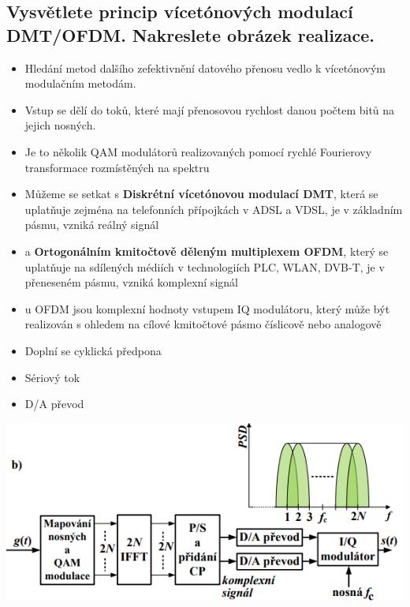 \subsection{Vysvětlete princip vícetónových modulací DMT/OFDM. Nakreslete obrázek realizace.}
\begin{itemize}
    \item Hledání metod dalšího zefektivnění datového přenosu vedlo k vícetónovým modulačním metodám.
    \item Vstup se dělí do toků, které mají přenosovou rychlost danou počtem bitů na jejich nosných.
    \item Je to několik QAM modulátorů realizovaných pomocí rychlé Fourierovy transformace rozmístěných na spektru
    \item Můžeme se setkat s \textbf{Diskrétní vícetónovou modulací DMT}, která se uplatňuje zejména na telefonních
    přípojkách v ADSL a VDSL, je v základním pásmu, vzniká reálný signál
    \item a \textbf{Ortogonálním kmitočtově děleným multiplexem OFDM}, který se uplatňuje na sdílených médiích
    v technologiích PLC, WLAN, DVB-T, je v přeneseném pásmu, vzniká komplexní signál
    \item  u OFDM jsou komplexní hodnoty vstupem IQ modulátoru, který může být realizován s ohledem na cílové
    kmitočtové pásmo číslicově nebo analogově
    \item Doplní se cyklická předpona
    \item Sériový tok
    \item D/A převod
\end{itemize}
\includegraphics[]{images/11_dmt_odf.png}
    
